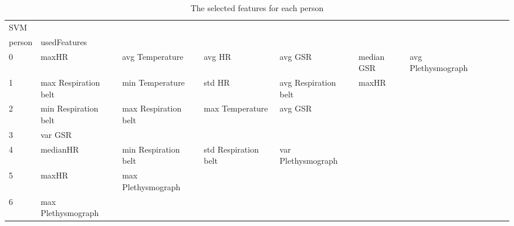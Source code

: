 \begin{landscape}
\begin{table}[]
\centering
\caption{The selected features for each person}
\begin{tabular}{l|llllllll}
SVM      &                         &                         &                         &                         &                         &                       &                         &                         &                         &         \\
person   & usedFeatures            &                         &                         &                         &                         &                       &                         &                         &                         &         \\
0        & maxHR                   & avg Temperature         & avg HR                  & avg GSR                 & median GSR              & avg Plethysmograph    &                         &                         &                         &         \\
1        & max Respiration belt    & min Temperature         & std HR                  & avg Respiration belt    & maxHR                   &                       &                         &                         &                         &         \\
2        & min Respiration belt    & max Respiration belt    & max Temperature         & avg GSR                 &                         &                       &                         &                         &                         &         \\
3        & var GSR                 &                         &                         &                         &                         &                       &                         &                         &                         &         \\
4        & medianHR                & min Respiration belt    & std Respiration belt    & var Plethysmograph      &                         &                       &                         &                         &                         &         \\
5        & maxHR                   & max Plethysmograph      &                         &                         &                         &                       &                         &                         &                         &         \\
6        & max Plethysmograph      &                         &                         &                         &                         &                       &                         &                         &                         &         \\

\end{tabular}
\end{table}
\end{landscape}
